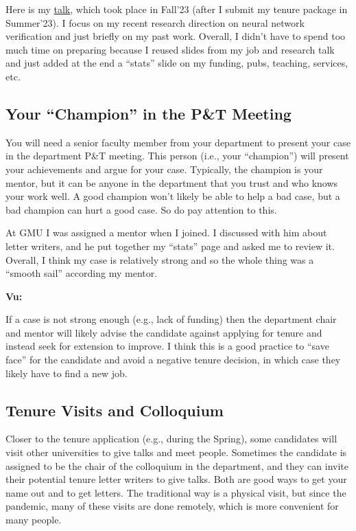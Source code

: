 \documentclass[oneside,11pt,dvipsnames]{book}
\newenvironment{commentbox}[1][]{
  \small
  \begin{mybox}
    {\small \textbf{#1}}
  }{
  \end{mybox}
}
\begin{document}
Here is my \href{https://dynaroars.github.io/people/nguyenthanhvuh/files/pt/slides.pdf}{talk}, which took place in Fall'23 (after I submit my tenure package in Summer'23). I focus on my recent research direction on neural network verification and just briefly on my past work. Overall, I didn't have to spend too much time on preparing because I reused slides from my job and research talk and just added at the end a ``stats'' slide on my funding, pubs, teaching, services, etc. 


\subsection{Your ``Champion'' in the P\&T Meeting}

You will need a senior faculty member from your department to present your case in the department P\&T meeting. This person (i.e., your ``champion'') will present your achievements and argue for your case.  Typically, the champion is your mentor, but it can be anyone in the department that you trust and who knows your work well.
A good champion won't likely be able to help a bad case, but a bad champion can hurt a good case.  So do pay attention to this.


At GMU I was assigned a mentor when I joined.  I discussed with him about letter writers, and he put together my ``stats'' page and asked me to review it. Overall, I think my case is relatively strong and so the whole thing was a ``smooth sail'' according my mentor. 

\begin{commentbox}[Vu:]
    If a case is not strong enough (e.g., lack of funding) then the department chair and mentor will likely advise the candidate against applying for tenure and instead seek for extension to improve. I think this is a good practice to  ``save face'' for the candidate and avoid a negative tenure decision, in which case they likely have to find a new job.
\end{commentbox}


\subsection{Tenure Visits and Colloquium} Closer to the tenure application (e.g., during the Spring), some candidates will visit other universities to give talks and meet people. 
Sometimes the candidate is assigned to be the chair of the colloquium in the department, and they can invite their potential tenure letter writers to give talks.
Both are good ways to get your name out and to get letters.
The traditional way is a physical visit, but since the pandemic, many of these visits are done remotely, which is more convenient for many people.
\end{document}
